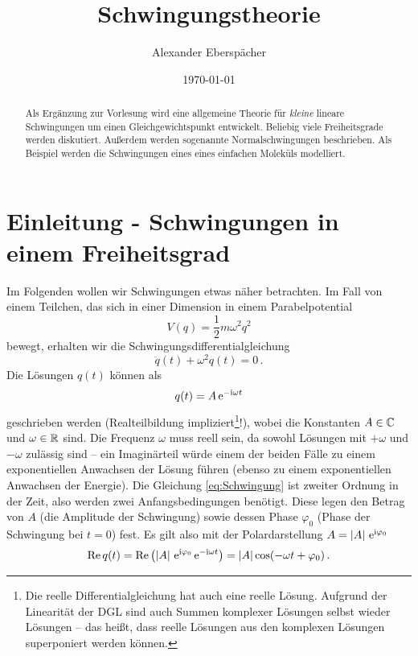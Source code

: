 \documentclass[paper=a4, fontsize=11.0pt, abstractoff, DIV12]{scrartcl}
\title{Schwingungstheorie}
\author{Alexander Eberspächer}
\date{\today}
\begin{document}
\maketitle
\begin{abstract}
Als Ergänzung zur Vorlesung wird eine allgemeine Theorie für \emph{kleine}
lineare Schwingungen um einen Gleichgewichtspunkt entwickelt. Beliebig viele
Freiheitsgrade werden diskutiert. Außerdem werden sogenannte
Normalschwingungen beschrieben. Als Beispiel werden die Schwingungen eines
eines einfachen Moleküls modelliert.
\end{abstract}

\section{Einleitung - Schwingungen in einem Freiheitsgrad}

Im Folgenden wollen wir Schwingungen etwas näher betrachten. Im Fall von
einem Teilchen, das sich in einer Dimension in einem Parabelpotential
\begin{equation}
V(q) = \frac{1}{2} m \omega^2 q^2
\label{eq:Pot}
\end{equation}
bewegt, erhalten wir die Schwingungsdifferentialgleichung
\begin{equation}
\ddot{q}(t) + \omega^2 q(t) = 0 \, .
\label{eq:Schwingung}
\end{equation}
Die Lösungen $q(t)$ können als
\begin{equation}
q(t) = A\,{\mathrm{e}}^{-\mathrm{i} \omega t}
\end{equation}
geschrieben werden (Realteilbildung impliziert\footnote{Die reelle
Differentialgleichung hat auch eine reelle Lösung. Aufgrund der Linearität
der DGL sind auch Summen komplexer Lösungen selbst wieder Lösungen -- das
heißt, dass reelle Lösungen aus den komplexen Lösungen superponiert werden
können.}!), wobei die Konstanten $A \in \mathbb{C}$ und $\omega \in \mathbb{R}$
sind. Die Frequenz $\omega$ muss reell sein, da sowohl Lösungen mit $+\omega$
und $-\omega$ zulässig sind -- ein Imaginärteil würde einem der beiden
Fälle zu einem exponentiellen Anwachsen der Lösung führen (ebenso zu einem
exponentiellen Anwachsen der Energie). Die Gleichung \eqref{eq:Schwingung}
ist zweiter Ordnung in der Zeit, also werden zwei Anfangsbedingungen
benötigt. Diese legen den Betrag von $A$ (die Amplitude der Schwingung)
sowie dessen Phase $\varphi_0$ (Phase der Schwingung bei $t=0$) fest. Es
gilt also mit der Polardarstellung $A = \left\vert A \right\vert\,{\mathrm{e}}^{\mathrm{i}\varphi_0}$
\begin{equation}
\operatorname{Re} q(t) = \operatorname{Re}\left( \left\vert A \right\vert\,{\mathrm{e}}^{\mathrm{i}\varphi_0}\,{\mathrm{e}}^{-\mathrm{i}\omega t}\right) = \left\vert A \right\vert \cos(-\omega t + \varphi_0)\, .
\end{equation}
\end{document}
